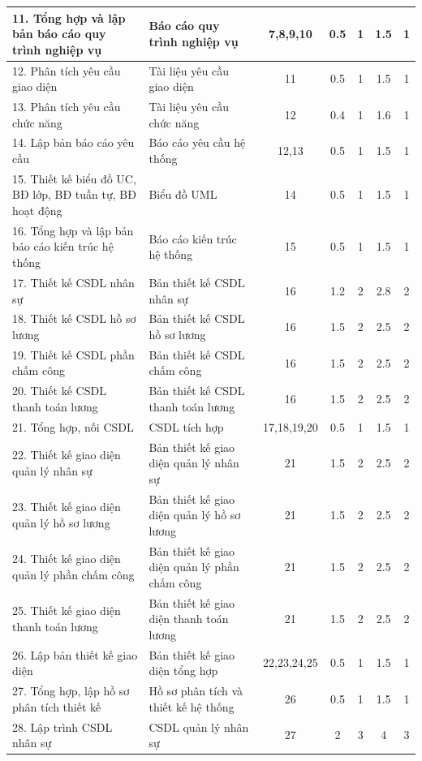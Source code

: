 \begin{longtable}{|p{5cm}|p{5cm}|c|c|c|c|c|}
    11. Tổng hợp và lập bản báo cáo quy trình nghiệp vụ & Báo cáo quy trình nghiệp vụ & 7,8,9,10 & 0.5 & 1 & 1.5 & 1 \\ \hline
    12. Phân tích yêu cầu giao diện & Tài liệu yêu cầu giao diện & 11 & 0.5 & 1 & 1.5 & 1 \\ \hline
    13. Phân tích yêu cầu chức năng & Tài liệu yêu cầu chức năng & 12 & 0.4 & 1 & 1.6 & 1 \\ \hline
    14. Lập bản báo cáo yêu cầu & Báo cáo yêu cầu hệ thống & 12,13 & 0.5 & 1 & 1.5 & 1 \\ \hline
    15. Thiết kế biểu đồ UC, BĐ lớp, BĐ tuần tự, BĐ hoạt động & Biểu đồ UML & 14 & 0.5 & 1 & 1.5 & 1 \\ \hline
    16. Tổng hợp và lập bản báo cáo kiến trúc hệ thống & Báo cáo kiến trúc hệ thống & 15 & 0.5 & 1 & 1.5 & 1 \\ \hline
    17. Thiết kế CSDL nhân sự & Bản thiết kế CSDL nhân sự & 16 & 1.2 & 2 & 2.8 & 2 \\ \hline
    18. Thiết kế CSDL hồ sơ lương & Bản thiết kế CSDL hồ sơ lương & 16 & 1.5 & 2 & 2.5 & 2 \\ \hline
    19. Thiết kế CSDL phần chấm công & Bản thiết kế CSDL chấm công & 16 & 1.5 & 2 & 2.5 & 2 \\ \hline
    20. Thiết kế CSDL thanh toán lương & Bản thiết kế CSDL thanh toán lương & 16 & 1.5 & 2 & 2.5 & 2 \\ \hline
    21. Tổng hợp, nối CSDL & CSDL tích hợp & 17,18,19,20 & 0.5 & 1 & 1.5 & 1 \\ \hline
    22. Thiết kế giao diện quản lý nhân sự & Bản thiết kế giao diện quản lý nhân sự & 21 & 1.5 & 2 & 2.5 & 2 \\ \hline
    23. Thiết kế giao diện quản lý hồ sơ lương & Bản thiết kế giao diện quản lý hồ sơ lương & 21 & 1.5 & 2 & 2.5 & 2 \\ \hline
    24. Thiết kế giao diện quản lý phần chấm công & Bản thiết kế giao diện quản lý phần chấm công & 21 & 1.5 & 2 & 2.5 & 2 \\ \hline
    25. Thiết kế giao diện thanh toán lương & Bản thiết kế giao diện thanh toán lương & 21 & 1.5 & 2 & 2.5 & 2 \\ \hline
    26. Lập bản thiết kế giao diện & Bản thiết kế giao diện tổng hợp & 22,23,24,25 & 0.5 & 1 & 1.5 & 1 \\ \hline
    27. Tổng hợp, lập hồ sơ phân tích thiết kế & Hồ sơ phân tích và thiết kế hệ thống & 26 & 0.5 & 1 & 1.5 & 1 \\ \hline
    28. Lập trình CSDL nhân sự & CSDL quản lý nhân sự & 27 & 2 & 3 & 4 & 3 \\ \hline

\end{longtable}
